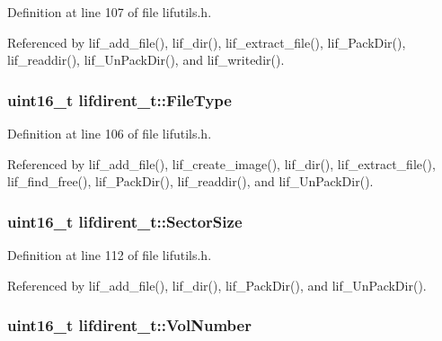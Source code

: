 Definition at line 107 of file lifutils.\+h.



Referenced by lif\+\_\+add\+\_\+file(), lif\+\_\+dir(), lif\+\_\+extract\+\_\+file(), lif\+\_\+\+Pack\+Dir(), lif\+\_\+readdir(), lif\+\_\+\+Un\+Pack\+Dir(), and lif\+\_\+writedir().

\subsubsection[{\texorpdfstring{File\+Type}{FileType}}]{\setlength{\rightskip}{0pt plus 5cm}uint16\+\_\+t lifdirent\+\_\+t\+::\+File\+Type}\hypertarget{structlifdirent__t_a48901a6b2b10471927397b3b569e386a}{}\label{structlifdirent__t_a48901a6b2b10471927397b3b569e386a}


Definition at line 106 of file lifutils.\+h.



Referenced by lif\+\_\+add\+\_\+file(), lif\+\_\+create\+\_\+image(), lif\+\_\+dir(), lif\+\_\+extract\+\_\+file(), lif\+\_\+find\+\_\+free(), lif\+\_\+\+Pack\+Dir(), lif\+\_\+readdir(), and lif\+\_\+\+Un\+Pack\+Dir().

\subsubsection[{\texorpdfstring{Sector\+Size}{SectorSize}}]{\setlength{\rightskip}{0pt plus 5cm}uint16\+\_\+t lifdirent\+\_\+t\+::\+Sector\+Size}\hypertarget{structlifdirent__t_a4c2a8fab6d73c7f1baa502c1ebef8658}{}\label{structlifdirent__t_a4c2a8fab6d73c7f1baa502c1ebef8658}


Definition at line 112 of file lifutils.\+h.



Referenced by lif\+\_\+add\+\_\+file(), lif\+\_\+dir(), lif\+\_\+\+Pack\+Dir(), and lif\+\_\+\+Un\+Pack\+Dir().

\subsubsection[{\texorpdfstring{Vol\+Number}{VolNumber}}]{\setlength{\rightskip}{0pt plus 5cm}uint16\+\_\+t lifdirent\+\_\+t\+::\+Vol\+Number}\hypertarget{structlifdirent__t_a9510c4f024400cff22c8abb54a4aca65}{}\label{structlifdirent__t_a9510c4f024400cff22c8abb54a4aca65}


